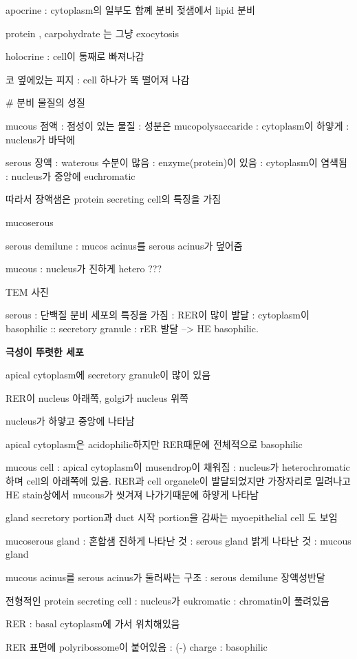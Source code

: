\documentclass[10pt]{amsart}
\numberwithin{theorem}{section}
\numberwithin{example}{section}
\theoremstyle{definition}
\theoremstyle{remark}
\begin{document}
apocrine : cytoplasm의 일부도 함꼐 분비 
젖샘에서 lipid 분비 

protein , carpohydrate 는 그냥 exocytosis

holocrine : cell이 통째로 빠져나감 

코 옆에있는 피지 : cell 하나가 똑 떨어져 나감 


# 분비 물질의 성질 

mucous 점액 : 점성이 있는 물질 : 성분은 mucopolysaccaride : cytoplasm이 하얗게 : nucleus가 바닥에 

serous 장액 : waterous 수분이 많음 : enzyme(protein)이 있음 : cytoplasm이 염색됨 : nucleus가 중앙에 euchromatic 

따라서 장액샘은 protein secreting cell의 특징을 가짐 


mucoserous

serous demilune : mucos acinus를 serous acinus가 덮어줌 

mucous : nucleus가 진하게 hetero ???


TEM 사진 

serous : 단백질 분비 세포의 특징을 가짐  : RER이 많이 발달 : cytoplasm이 basophilic :: secretory granule : rER 발달 --> HE basophilic.

\textbf{극성이 뚜렷한 세포 }

apical cytoplasm에 secretory granule이 많이 있음 

RER이 nucleus 아래쪽, golgi가 nucleus 위쪽

nucleus가 하얗고 중앙에 나타남 

apical cytoplasm은 acidophilic하지만 RER때문에 전체적으로 basophilic



mucous cell : apical cytoplasm이 musendrop이 채워짐 : nucleus가 heterochromatic하며 cell의 아래쪽에 있음.  RER과 cell organele이  발달되었지만 가장자리로 밀려나고
HE stain상에서 mucous가 씻겨져 나가기때문에 하얗게 나타남 

gland secretory portion과 duct 시작 portion을 감싸는 myoepithelial cell 도 보임 


mucoserous gland : 혼합샘 
진하게 나타난 것 : serous gland
밝게 나타난 것 : mucous gland 

mucous acinus를 serous acinus가 둘러싸는 구조 : serous demilune 장액성반달 

전형적인 protein secreting cell : nucleus가 eukromatic : chromatin이 풀려있음

RER : basal cytoplasm에 가서 위치해있음 

RER 표면에 polyribossome이 붙어있음 : (-) charge : basophilic 
\end{document}
